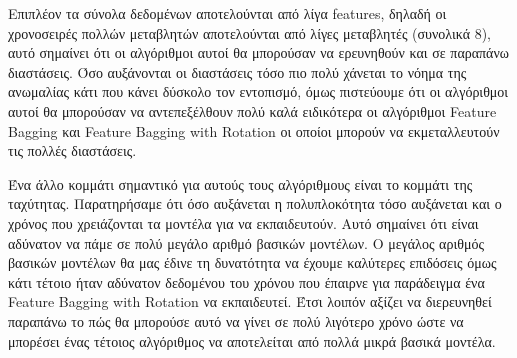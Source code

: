 \documentclass[a4paper,12pt]{report}
\theoremstyle{definitionNODot}
\begin{document}
	Επιπλέον τα σύνολα δεδομένων αποτελούνται από λίγα features, δηλαδή οι χρονοσειρές πολλών μεταβλητών αποτελούνται από λίγες μεταβλητές (συνολικά 8), αυτό σημαίνει ότι οι αλγόριθμοι αυτοί θα μπορούσαν να ερευνηθούν και σε παραπάνω διαστάσεις. Όσο αυξάνονται οι διαστάσεις τόσο πιο πολύ χάνεται το νόημα της ανωμαλίας κάτι που κάνει δύσκολο τον εντοπισμό, όμως πιστεύουμε ότι οι αλγόριθμοι αυτοί θα μπορούσαν να αντεπεξέλθουν πολύ καλά ειδικότερα οι αλγόριθμοι Feature Bagging και Feature Bagging with Rotation οι οποίοι μπορούν να εκμεταλλευτούν τις πολλές διαστάσεις.
	
	Ένα άλλο κομμάτι σημαντικό για αυτούς τους αλγόριθμους είναι το κομμάτι της ταχύτητας. Παρατηρήσαμε ότι όσο αυξάνεται η πολυπλοκότητα τόσο αυξάνεται και ο χρόνος που χρειάζονται τα μοντέλα για να εκπαιδευτούν. Αυτό σημαίνει ότι είναι αδύνατον να πάμε σε πολύ μεγάλο αριθμό βασικών μοντέλων. Ο μεγάλος αριθμός βασικών μοντέλων θα μας έδινε τη δυνατότητα να έχουμε καλύτερες επιδόσεις όμως κάτι τέτοιο ήταν αδύνατον δεδομένου του χρόνου που έπαιρνε για παράδειγμα ένα Feature Bagging with Rotation να εκπαιδευτεί. Έτσι λοιπόν αξίζει να διερευνηθεί παραπάνω το πώς θα μπορούσε αυτό να γίνει σε πολύ λιγότερο χρόνο ώστε να μπορέσει ένας τέτοιος αλγόριθμος να αποτελείται από πολλά μικρά βασικά μοντέλα.
	
	
	
	
	
	
\end{document}
